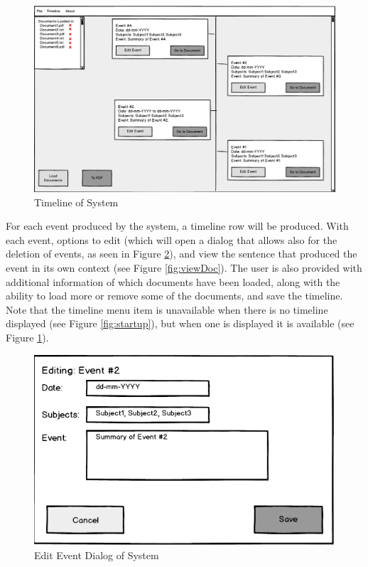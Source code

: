 \begin{figure}[H]
\caption{Timeline of System}
\label{fig:timeline}
\includegraphics[width=\linewidth]{timeline.png}
\centering
\end{figure}
\par For each event produced by the system, a timeline row will be produced. With each event, options to edit (which will open a dialog that allows also for the deletion of events, as seen in Figure \ref{fig:editDialog}), and view the sentence that produced the event in its own context (see Figure \ref{fig:viewDoc}). The user is also provided with additional information of which documents have been loaded, along with the ability to load more or remove some of the documents, and save the timeline. Note that the timeline menu item is unavailable when there is no timeline displayed (see Figure \ref{fig:startup}), but when one is displayed it is available (see Figure \ref{fig:timeline}).
\begin{figure}[H]
\caption{Edit Event Dialog of System}
\label{fig:editDialog}
\includegraphics[scale=0.6]{editDialog.png}
\centering
\end{figure}


